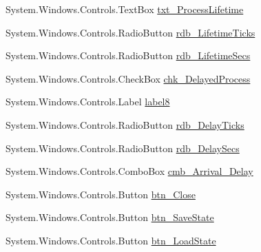 \begin{DoxyCompactItemize}
System.\+Windows.\+Controls.\+Text\+Box \hyperlink{class_c_p_u___o_s___simulator_1_1_operating_system_main_window_acc33a47fbe7956196846504306f7489e}{txt\+\_\+\+Process\+Lifetime}
\item 
System.\+Windows.\+Controls.\+Radio\+Button \hyperlink{class_c_p_u___o_s___simulator_1_1_operating_system_main_window_ae338ba4b15d62c6d584aaa5814fa8506}{rdb\+\_\+\+Lifetime\+Ticks}
\item 
System.\+Windows.\+Controls.\+Radio\+Button \hyperlink{class_c_p_u___o_s___simulator_1_1_operating_system_main_window_a09745c9a76909a398d8a47295fda2b67}{rdb\+\_\+\+Lifetime\+Secs}
\item 
System.\+Windows.\+Controls.\+Check\+Box \hyperlink{class_c_p_u___o_s___simulator_1_1_operating_system_main_window_aa7e58acf30f50880e309615f92f0ef8e}{chk\+\_\+\+Delayed\+Process}
\item 
System.\+Windows.\+Controls.\+Label \hyperlink{class_c_p_u___o_s___simulator_1_1_operating_system_main_window_af57c4cce87917105945b6c5d1f6b812e}{label8}
\item 
System.\+Windows.\+Controls.\+Radio\+Button \hyperlink{class_c_p_u___o_s___simulator_1_1_operating_system_main_window_a7b70deef80df6719fc0b7b9c87c268d7}{rdb\+\_\+\+Delay\+Ticks}
\item 
System.\+Windows.\+Controls.\+Radio\+Button \hyperlink{class_c_p_u___o_s___simulator_1_1_operating_system_main_window_a7b4585b869d26fa4e7d419a064f4f73c}{rdb\+\_\+\+Delay\+Secs}
\item 
System.\+Windows.\+Controls.\+Combo\+Box \hyperlink{class_c_p_u___o_s___simulator_1_1_operating_system_main_window_ad4e310b5bbd70de23e9132fb57229c96}{cmb\+\_\+\+Arrival\+\_\+\+Delay}
\item 
System.\+Windows.\+Controls.\+Button \hyperlink{class_c_p_u___o_s___simulator_1_1_operating_system_main_window_ad0ca6083cb0afc42ce05182655540a45}{btn\+\_\+\+Close}
\item 
System.\+Windows.\+Controls.\+Button \hyperlink{class_c_p_u___o_s___simulator_1_1_operating_system_main_window_a9320f9ba12e9a1e460840eca6bda4e17}{btn\+\_\+\+Save\+State}
\item 
System.\+Windows.\+Controls.\+Button \hyperlink{class_c_p_u___o_s___simulator_1_1_operating_system_main_window_ada2a0a3adb1f88558207fdd5b5dbea30}{btn\+\_\+\+Load\+State}
\end{DoxyCompactItemize}
